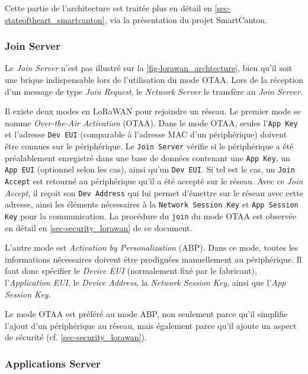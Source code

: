 Cette partie de l'architecture est traitée plus en détail en \cref{sec-stateoftheart_smartcanton}, via la présentation du projet SmartCanton.

\subsubsection{Join Server}

Le \textit{Join Server} n'est pas illustré sur la \cref{fig-lorawan_archtecture}, bien qu'il soit une brique indispensable lors de l'utilisation du mode OTAA. Lors de la réception d'un message de type \textit{Join Request}, le \textit{Network Server} le transfère au \textit{Join Server}. 

Il existe deux modes en LoRaWAN pour rejoindre un réseau. Le premier mode se nomme \textit{Over-the-Air Activation} (OTAA). Dans le mode OTAA, seules l'\texttt{App Key} et l'adresse \texttt{Dev EUI} (comparable à l'adresse MAC d'un périphérique) doivent être connues sur le périphérique. Le \texttt{Join Server} vérifie si le périphérique a été préalablement enregistré dans une base de données contenant une \texttt{App Key}, un \texttt{App EUI} (optionnel selon les cas), ainsi qu'un \texttt{Dev EUI}. Si tel est le cas, un \texttt{Join Accept} est retourné au périphérique qu'il a été accepté sur le réseau. Avec ce \textit{Join Accept}, il reçoit son \texttt{Dev Address} qui lui permet d'émettre sur le réseau avec cette adresse, ainsi les éléments nécessaires à la \texttt{Network Session Key} et \texttt{App Session Key} pour la communication. La procédure du \texttt{join} du mode OTAA est observée en détail en \cref{sec-security_lorawan} de ce document.

L'autre mode est \textit{Activation by Personalization} (ABP). Dans ce mode, toutes les informations nécessaires doivent être prodiguées manuellement au périphérique. Il faut donc spécifier le \textit{Device EUI} (normalement fixé par le fabricant), l'\textit{Application EUI}, le \textit{Device Address}, la \textit{Network Session Key}, ainsi que l’\textit{App Session Key}.

Le mode OTAA est préféré au mode ABP, non seulement parce qu'il simplifie l'ajout d'un périphérique au réseau, mais également parce qu'il ajoute un aspect de sécurité (cf. \cref{sec-security_lorawan}).

\subsubsection{Applications Server}


